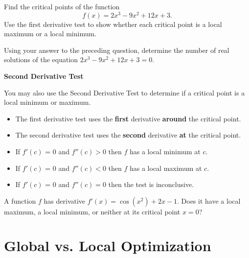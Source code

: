 \vspace{1.5mm}


\newpage

\problem Find the critical points of the function
$$f(x) = 2 x^3 - 9 x^2 + 12 x +3.$$ Use the first derivative test to
show whether each critical point is a local maximum or a local
minimum.

\vfill
\vfill

\newpage 

\problem Using your answer to the preceding question, determine the
number of real solutions of the equation
$2 x^3 - 9 x^2 + 12 x + 3 = 0$.

\vfill

\newpage 
\begin{boxnote}
{\bf Second Derivative Test}

You may also use the Second Derivative Test to determine if a critical
point is a local minimum or maximum.  
\begin{itemize}
\item The first derivative test uses the {\bf first} derivative {\bf
    around} the critical point.
\item The second derivative test uses the {\bf second} derivative {\bf at} the critical point.
\end{itemize}
\begin{itemize}
\item If $f'(c)$ = 0 and $f''(c) > 0$ then $f$ has a local minimum at $c$. \\[2ex]
\item If $f'(c)$ = 0 and $f''(c) < 0$ then $f$ has a local maximum at $c$. \\[2ex]
\item If $f'(c)$ = 0 and $f''(c) = 0$ then the test is inconclusive. \\[2ex]
\end{itemize}
\end{boxnote}

\vsc
\newpage
\problem A function $f$ has derivative $f'(x) = \cos(x^2) + 2x - 1$.
  Does it have a local maximum, a local minimum, or neither at its
  critical point $x=0$?

\newpage 

\section*{Global vs. Local Optimization}

